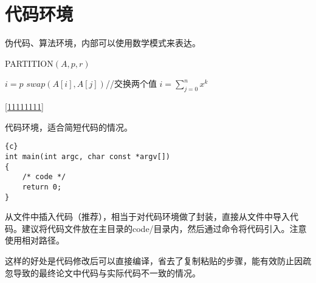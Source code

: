 \documentclass[../../main.tex]{subfiles}
\begin{document}
\section{代码环境}

伪代码、算法环境，内部可以使用数学模式来表达。
\begin{algorithm}[!h]
	\caption{PARTITION$(A,p,r)$}%
	
	\label{11111111}

	\begin{algorithmic}[1]%


		\STATE $i=p$
		\STATE $swap(A[i],A[j])$//交换两个值
		\STATE $i=\sum_{j=0}^{n} x^k$
		\ENDIF
		\ENDFOR
	\end{algorithmic}
\end{algorithm}


\autoref{11111111}

代码环境，适合简短代码的情况。

\begin{lstlisting}{c}
int main(int argc, char const *argv[])
{
	/* code */
	return 0;
}
\end{lstlisting}

从文件中插入代码（推荐），相当于对代码环境做了封装，直接从文件中导入代码。建议将代码文件放在主目录的code/目录内，然后通过\verb||命令将代码引入。注意使用相对路径。

这样的好处是代码修改后可以直接编译，省去了复制粘贴的步骤，能有效防止因疏忽导致的最终论文中代码与实际代码不一致的情况。

\end{document}
